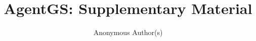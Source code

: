 \documentclass[sigconf,anonymous]{aamas}
\title[AgentGS Supplementary Material]{AgentGS: Supplementary Material}
\author{Anonymous Author(s)}
\begin{document}
\maketitle


\FloatBarrier
\end{document}
